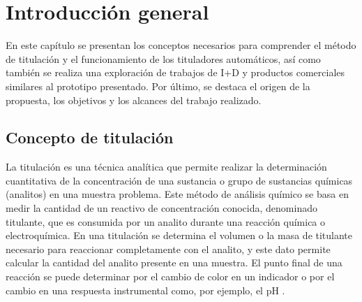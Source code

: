 
\chapter{Introducción general} %

\label{Chapter1} %
\label{IntroGeneral}


\newcommand{\keyword}[1]{\textbf{#1}}
\newcommand{\tabhead}[1]{\textbf{#1}}
\newcommand{\code}[1]{\texttt{#1}}
\newcommand{\file}[1]{\texttt{\bfseries#1}}
\newcommand{\option}[1]{\texttt{\itshape#1}}
\newcommand{\grados}{$^{\circ}$}


En este capítulo se presentan los conceptos necesarios para comprender el método de titulación y el funcionamiento de los tituladores automáticos, así como también se realiza una exploración de trabajos de I+D y productos comerciales similares al prototipo presentado. Por último, se destaca el origen de la propuesta, los objetivos y los alcances del trabajo realizado.

\section{Concepto de titulación}

La titulación es una técnica analítica que permite realizar la determinación cuantitativa de la concentración de una sustancia o grupo de sustancias químicas (analitos) en una muestra problema. Este método de análisis químico se basa en medir la cantidad de un reactivo de concentración conocida, denominado titulante, que es consumida por un analito durante una reacción química o electroquímica. En una titulación se determina el volumen o la masa de titulante necesario para reaccionar completamente con el analito, y este dato permite calcular la cantidad del analito presente en una muestra. El punto final de una reacción se puede determinar por el cambio de color en un indicador o por el cambio en una respuesta instrumental como, por ejemplo, el pH \citep{BOOK:1}.

